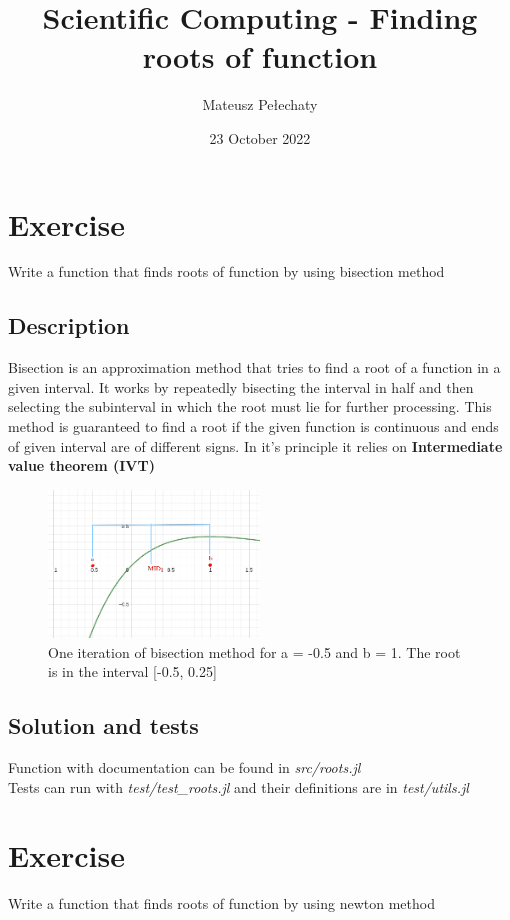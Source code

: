 \documentclass[11pt]{article}
\title{Scientific Computing - Finding roots of function}
\author{Mateusz Pełechaty}
\date{23 October 2022}%
\begin{document}
\maketitle


\section{Exercise}
Write a function that finds roots of function by using bisection method
\subsection*{Description}
Bisection is an approximation method that tries to find a root of a function in a given interval. 
It works by repeatedly bisecting the interval in half
and then selecting the subinterval in which the root must lie for further processing.
This method is guaranteed to find a root if the given function is continuous and ends of given interval are 
of different signs. In it's principle it relies on \textbf{Intermediate value theorem (IVT)}
\begin{figure}[h]
    \centering
    \includegraphics[width=0.5\textwidth]{bisection_example.png}
    \caption{One iteration of bisection method for a = -0.5 and b = 1. The root is in the interval [-0.5, 0.25]}
\end{figure}
\subsection*{Solution and tests}
Function with documentation can be found in \textit{src/roots.jl}\\
Tests can run with \textit{test/test\_roots.jl} and their definitions are in \textit{test/utils.jl}
\section{Exercise}
Write a function that finds roots of function by using newton method
\end{document}
